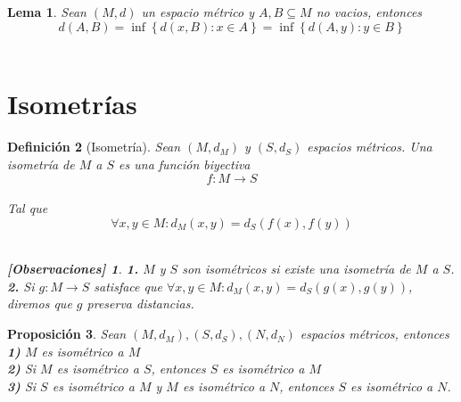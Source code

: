 \documentclass[oneside]{book} %
\theoremstyle{Teorema}
\newtheorem{Definicion}{Definición}[chapter]
\newtheorem{Proposicion}[Definicion]{Proposición}
\newtheorem{Lema}[Definicion]{Lema}
\theoremstyle{Ejemplos}
\theoremstyle{[Obs]}
\newtheorem*{Obs}{[Observaciones]}
\renewcommand{\{}{\left\lbrace} %
\renewcommand{\}}{\right\rbrace} %
\renewcommand{\sc}{\subseteq} %
\begin{document}
			\begin{Lema}
				
				Sean $(M, d)$ un espacio métrico y $A, B \sc M$ no vacios, entonces \\

				\[ d(A, B) = \inf\{ d(x, B) : x \in A \} = \inf\{ d(A, y) : y \in B \} \] \\

			\end{Lema}

		\section{Isometrías}

			\begin{Definicion}[Isometría]
				
				Sean $(M, d_M)$ y $(S, d_S)$ espacios métricos. Una isometría de $M$ a $S$ es una función biyectiva \\
				
				\[ f : M \to S \] \\

				Tal que \\

				\[ \forall x, y \in M : d_M(x, y) = d_S(f(x), f(y)) \] \\

				\begin{Obs}
				
					\hfill
				
					\textbf{1.} $M$ y $S$ son isométricos si existe una isometría de $M$ a $S$. \\

					\textbf{2.} Si $g : M \to S$ satisface que $\forall x, y \in M : d_M(x, y) = d_S(g(x), g(y))$, diremos que $g$ preserva distancias. \\ 
				
				\end{Obs}

			\end{Definicion}

			\begin{Proposicion}
				
				Sean $(M, d_M), (S, d_S), (N, d_N)$ espacios métricos, entonces \\

				\textbf{1)} $M$ es isométrico a $M$ \\

				\textbf{2)} Si $M$ es isométrico a $S$, entonces $S$ es isométrico a $M$ \\

				\textbf{3)} Si $S$ es isométrico a $M$ y $M$ es isométrico a $N$, entonces $S$ es isométrico a $N$. \\

			\end{Proposicion}
\end{document}
